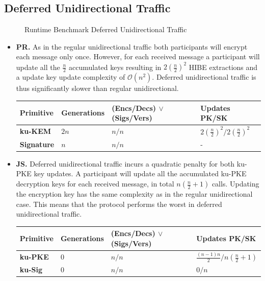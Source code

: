 \documentclass[11pt,a4paper,twoside,openright,bibliography=totoc]{scrbook}
\begin{document}
\clearpage

\subsection{Deferred Unidirectional Traffic}
\label{sec:deferr-unid-traff-1}

\begin{figure}[H]
  \centering
   
  \caption{Runtime Benchmark Deferred Unidirectional Traffic}
  \label{fig:time-def-uni}
\end{figure}

\begin{itemize}
\item \textbf{PR.} As in the regular unidirectional traffic both
  participants will encrypt each message only once. However, for
  each received message a participant will update all
  the $\frac{n}{2}$ accumulated keys resulting in $2(\frac{n}{2})^2$
  HIBE extractions and a update key update complexity of $\mathcal{O}(n^2)$.
  Deferred unidirectional traffic is thus significantly slower than
  regular unidirectional.
  \begin{center}
    \begin{tabular}{ | l | l | l | l |}
    \hline
    Primitive & Generations & (Encs/Decs) $\vee$ (Sigs/Vers) & Updates PK/SK \\ \hline
    \textbf{ku-KEM} & $2n$ & $n/n$ & $2(\frac{n}{2})^2/2(\frac{n}{2})^2$ \\ \hline
    \textbf{Signature} & $n$ & $n/n$ & - \\  
    \hline
    \end{tabular}
  \end{center}
\item \textbf{JS.} Deferred unidirectional traffic incurs a quadratic
  penalty for both ku-PKE key updates. A participant
  will update all the accumulated ku-PKE decryption keys for
  each received message, in total $n(\frac{n}{2}+1)$ calls.
  Updating the encryption key has the same complexity as in the
  regular unidirectional case. This means that the protocol
  performs the worst in deferred unidirectional traffic.
  \begin{center}
    \begin{tabular}{ | l | l | l | l |}
    \hline
    Primitive & Generations & (Encs/Decs) $\vee$ (Sigs/Vers) & Updates PK/SK \\ \hline
    \textbf{ku-PKE} & $0$ & $n/n$ & $\frac{(n-1)n}{2}/n(\frac{n}{2}+1)$ \\ \hline
    \textbf{ku-Sig} & $0$ & $n/n$ & $0/n$ \\  
    \hline
    \end{tabular}
  \end{center}

\end{itemize}
\end{document}

